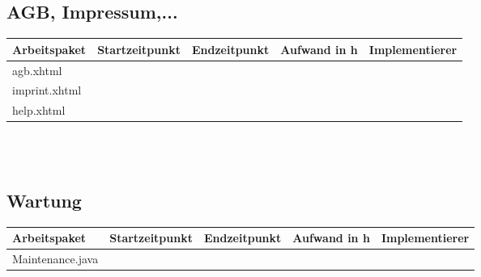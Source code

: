 \begin{landscape}
	\subsection{AGB, Impressum,...}
	\begin{tabular}{|p{10cm}|p{4cm}|p{3cm}|p{3cm}|p{3cm}|}
		\hline  \textbf{Arbeitspaket} & \textbf{Startzeitpunkt} & \textbf{Endzeitpunkt} & \textbf{Aufwand in h} & \textbf{Implementierer} \\ 
		\hline   agb.xhtml                                 &                            &                             &                     &\\
		\hline   imprint.xhtml                              &                            &                             &                     &\\
		\hline   help.xhtml        &                            &                             &                     &\\
		\hline 
	\end{tabular} \ \\
	\ \\	
	
	\subsection{Wartung}
	\begin{tabular}{|p{10cm}|p{4cm}|p{3cm}|p{3cm}|p{3cm}|}
		\hline  \textbf{Arbeitspaket} & \textbf{Startzeitpunkt} & \textbf{Endzeitpunkt} & \textbf{Aufwand in h} & \textbf{Implementierer} \\ 
		\hline   Maintenance.java                           &                            &                             &                     &\\
		\hline
	\end{tabular}				
\end{landscape}